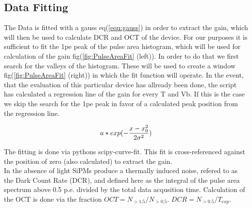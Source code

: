 \documentclass[article,type=pp,colorback,accentcolor=tud9c]{tudthesis}
\begin{document}
    \subsection{Data Fitting}
The Data is fitted with a gauss eq(\ref{equ:gauss}) in order to extract the gain, which will then be used to calculate DCR and OCT of the device. 
For our purposes it is sufficient to fit the 1pe peak of the pulse area histogram, which will be used for calculation of the gain fig(\ref{fig:PulseAreaFit} (left)). In order to do that we first search for the valleys of the histogram. These will be used to create a window fig(\ref{fig:PulseAreaFit} (right)) in which the fit function will operate. In the event, that the evaluation of this particular device has allready been done, the script has calculated a regression line of the gain for every T and Vb. If this is the case we skip the search for the 1pe peak in favor of a calculated peak position from the regression line.   

\begin{equation}
\begin{centering}
  a*exp(-\frac{x-x_0^2}{2\sigma^2})
\label{equ:gauss}
\end{centering}
\end{equation}


\newpage

\begin{figure}[h]
\begin{centering}
}
\resizebox{0.4\columnwidth}{!}{\texttt{[image: ./Fig/Analysis\_page/\{HAM\_T22.0\_Vb68.0.trcPulseAreaFit]}.pdf}}
\caption{PulseAreaFit | different stages of the analysis process}
\label{fig:PulseAreaFit}
\end{centering}
\end{figure} 



The fitting is done via pythons scipy-curve-fit. This fit is cross-referenced against the position of zero (also calculated) to extract the gain.\\
In the absence of light SiPMs produce a thermally induced noise, refered to as the Dark Count Rate (DCR), and defined here as the integral of the pulse area spectrum above 0.5 p.e. divided by the total data acqusition time. Calculation of the OCT is done via the fraction $OCT = N_{>1.5}/N_{>0.5}$.    $DCR = N_{>0.5}/T_{exp}$.  
\end{document}
